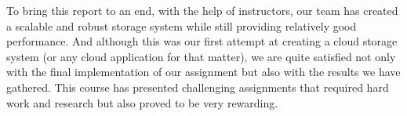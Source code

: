 \documentclass[sigconf]{acmart}
\begin{document}
To bring this report to an end, with the help of instructors, our team has created a scalable and robust storage system while still providing relatively good performance. And although this was our first attempt at creating a cloud storage system (or any cloud application for that matter), we are quite satisfied not only with the final implementation of our assignment but also with the results we have gathered. This course has presented challenging assignments that required hard work and research but also proved to be very rewarding.
\end{document}
